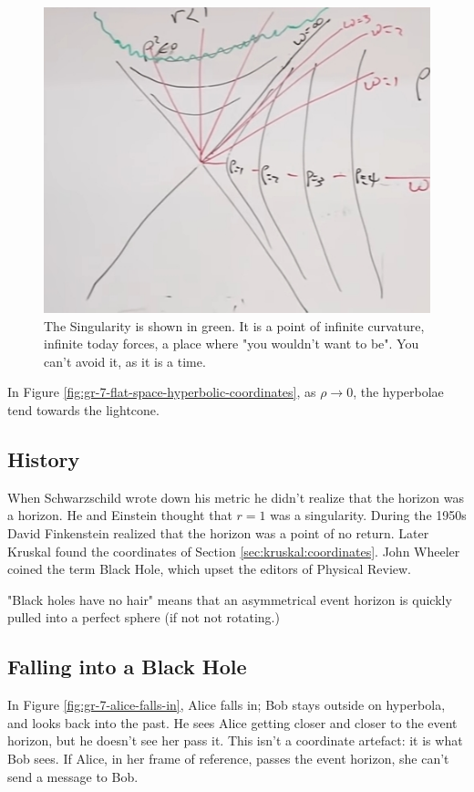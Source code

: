 \documentclass[]{article}
\begin{document}
{\begin{figure}[H]
	\caption[The Singularity]{The Singularity is shown in green. It is a point of infinite curvature, infinite today forces, a place where "you wouldn't want to be". You can't avoid it, as it is a time.}\label{fig:gr-7-singularity}
	\includegraphics{gr-7-singularity}
\end{figure}

In Figure \ref{fig:gr-7-flat-space-hyperbolic-coordinates}, as $\rho \rightarrow 0$, the hyperbolae tend towards the lightcone.

\subsection{History}

When Schwarzschild wrote down his metric he didn't realize that the horizon was a horizon.
He and Einstein thought that $r=1$ was a singularity.
 During the 1950s David Finkenstein realized that the horizon was a point of no return. Later Kruskal found the coordinates of Section \ref{sec:kruskal:coordinates}. John Wheeler coined the term Black Hole, which upset the editors of Physical Review.
 
 "Black holes have no hair" means that an asymmetrical event horizon is quickly pulled into a perfect sphere (if not not rotating.)
 
 \subsection{Falling into a Black Hole}
 
 In Figure \ref{fig:gr-7-alice-falls-in}, Alice falls in; Bob stays outside on hyperbola, and looks back into the past. He sees Alice getting closer and closer to the event horizon, but he doesn't see her pass it. This isn't a coordinate artefact: it is what Bob sees. If Alice, in her frame of reference, passes the event horizon, she can't send a message to Bob.
 
}
\end{document}
